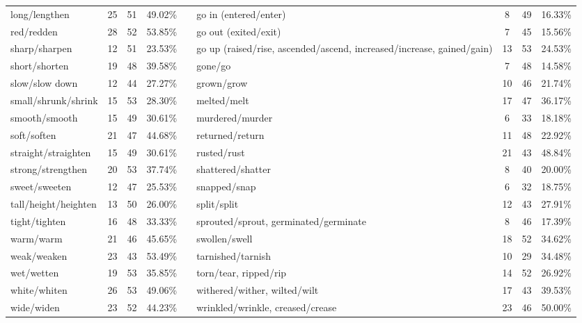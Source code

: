 \begin{tabular}{p{3cm}ccccp{3cm}ccc}
long/lengthen & 25 & 51 & 49.02\% & & go in (entered/enter) & 8 & 49 & 16.33\% \\
red/redden & 28 & 52 & 53.85\% & & go out (exited/exit) & 7 & 45 & 15.56\% \\
sharp/sharpen & 12 & 51 & 23.53\% & & go up (raised/rise, ascended/ascend, increased/increase, gained/gain) & 13 & 53 & 24.53\% \\
short/shorten & 19 & 48 & 39.58\% & & gone/go & 7 & 48 & 14.58\% \\
slow/slow down & 12 & 44 & 27.27\% & & grown/grow & 10 & 46 & 21.74\% \\
small/shrunk/shrink & 15 & 53 & 28.30\% & & melted/melt & 17 & 47 & 36.17\% \\
smooth/smooth & 15 & 49 & 30.61\% & & murdered/murder & 6 & 33 & 18.18\% \\
soft/soften & 21 & 47 & 44.68\% & & returned/return & 11 & 48 & 22.92\% \\
straight/straighten & 15 & 49 & 30.61\% & & rusted/rust & 21 & 43 & 48.84\% \\
strong/strengthen & 20 & 53 & 37.74\% & & shattered/shatter & 8 & 40 & 20.00\% \\
sweet/sweeten & 12 & 47 & 25.53\% & & snapped/snap & 6 & 32 & 18.75\% \\
tall/height/heighten & 13 & 50 & 26.00\% & & split/split & 12 & 43 & 27.91\% \\
tight/tighten & 16 & 48 & 33.33\% & & sprouted/sprout, germinated/germinate & 8 & 46 & 17.39\% \\
warm/warm & 21 & 46 & 45.65\% & & swollen/swell & 18 & 52 & 34.62\% \\
weak/weaken & 23 & 43 & 53.49\% & & tarnished/tarnish & 10 & 29 & 34.48\% \\
wet/wetten & 19 & 53 & 35.85\% & & torn/tear, ripped/rip & 14 & 52 & 26.92\% \\
white/whiten & 26 & 53 & 49.06\% & & withered/wither, wilted/wilt & 17 & 43 & 39.53\% \\
wide/widen & 23 & 52 & 44.23\% & & wrinkled/wrinkle, creased/crease & 23 & 46 & 50.00\%
\end{tabular}